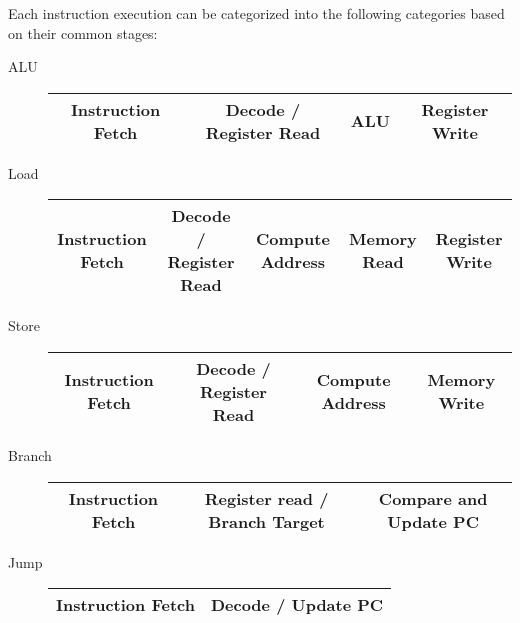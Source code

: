 \documentclass[12pt letter]{report}
\begin{document}
Each instruction execution can be categorized into the following categories based on their common stages:
\begin{description}
  \item [ALU]
        \begin{table}[H]
          \begin{center}
            \begin{tabular}{|c|c|c|c|}
              \hline
              Instruction Fetch & Decode / Register Read & ALU & Register Write \\
              \hline
            \end{tabular}
          \end{center}
        \end{table}
  \item[  Load ]
        \begin{table}[H]
          \begin{center}
            \begin{tabular}{|c|c|c|c|c|}
              \hline
              Instruction Fetch & Decode / Register Read & Compute Address & Memory Read & Register Write \\
              \hline
            \end{tabular}
          \end{center}
        \end{table}
  \item[  Store ]
        \begin{table}[H]
          \begin{center}
            \begin{tabular}{|c|c|c|c|}
              \hline
              Instruction Fetch & Decode / Register Read & Compute Address & Memory Write \\
              \hline
            \end{tabular}
          \end{center}
        \end{table}
  \item[  Branch]
        \begin{table}[H]
          \begin{center}
            \begin{tabular}{|c|c|c|}
              \hline
              Instruction Fetch & Register read / Branch Target & Compare and Update PC \\
              \hline
            \end{tabular}
          \end{center}
        \end{table}
  \item[  Jump ]
        \begin{table}[H]
          \begin{center}
            \begin{tabular}{|c|c|}
              \hline
              Instruction Fetch & Decode / Update PC \\
              \hline
            \end{tabular}
          \end{center}
        \end{table}
\end{description}
\end{document}
